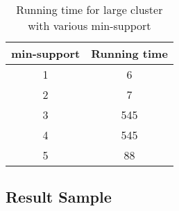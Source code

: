 \documentclass[11pt]{article}
\begin{document}
\begin{table}[h!]
    \centering
    \begin{tabular}{||c c||}
        \hline
        min-support & Running time \\ [0.5ex]
        \hline\hline
        1 & 6 \\
        2 & 7 \\
        3 & 545 \\
        4 & 545 \\
        5 & 88 \\ [1ex]
        \hline
    \end{tabular}
    \caption{Running time for large cluster with various min-support}
    \label{table:3}
\end{table}


\subsection {Result Sample}
\end{document}
